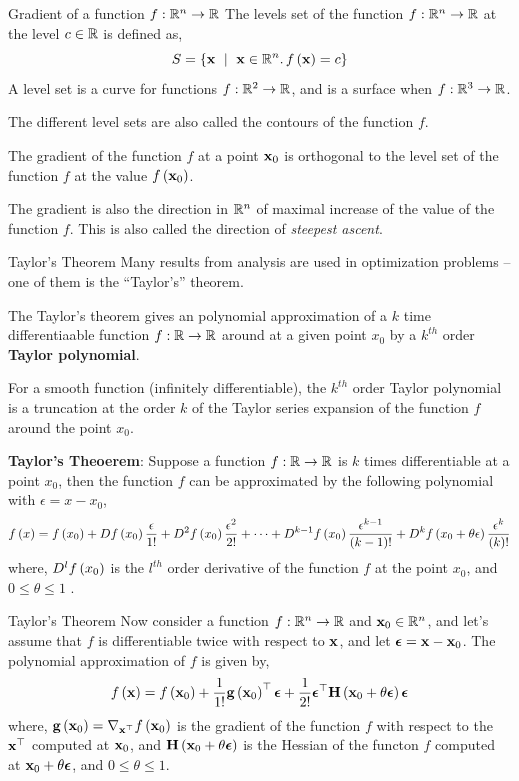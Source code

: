 \documentclass[aspectratio=169]{beamer}
\def\mf{\ensuremath\mathbf}
\def\mb{\ensuremath\mathbb}
\def\lp{\ensuremath\left(}
\def\rp{\ensuremath\right)}
\def\lc{\ensuremath\left\{}
\def\rc{\ensuremath\right\}}
\def\R{\ensuremath\mb{R}}
\newcommand{\ct}[1]{\lp #1\rp}
\begin{document}
\begin{frame}{Gradient of a function $f: \R^n \to \R$}
  The levels set of the function $f: \R^n \to \R$ at the level $c \in \R$ is defined as,
  \[ S = \lc \mf{x} \,\, \mid \,\, \mf{x} \in \R^n. \, f\ct{\mf{x}} = c\rc \] 
  A level set is a curve for functions $f: \R^2 \to \R$, and is a surface when $f: \R^3 \to \R$.
  \vspace{0.25cm}

  The different level sets are also called the contours of the function $f$.
  \vspace{0.25cm}

  The gradient of the function $f$ at a point $\mf{x}_0$ is orthogonal to the level set of the function $f$ at the value $f\ct{\mf{x}_0}$.
  \vspace{0.25cm}

  The gradient is also the direction in $\R^n$ of maximal increase of the value of the function $f$. This is also called the direction of \textit{steepest ascent}.
\end{frame}


\begin{frame}{Taylor's Theorem}
  Many results from analysis are used in optimization problems --  one of them is the ``Taylor's'' theorem.

  The Taylor's theorem gives an polynomial approximation of a $k$ time differentiaable function $f: \R \to \R$ around at a given point $x_0$ by a $k^{th}$ order \textbf{Taylor polynomial}.

  For a smooth function (infinitely differentiable), the $k^{th}$ order Taylor polynomial is a truncation at the order $k$ of the Taylor series expansion of the function $f$ around the point $x_0$.

  \textbf{Taylor's Theoerem}: Suppose a function $f: \R \to \R$ is $k$ times differentiable at a point $x_0$, then the function $f$ can be approximated by the following polynomial with $\epsilon = x - x_0$,
  \[ f\ct{x} = f\ct{x_0} + Df\ct{x_0} \frac{\epsilon}{1!} + D^2f\ct{x_0} \frac{\epsilon^2}{2!} + \cdots + D^{k-1}f\ct{x_0}\frac{\epsilon^{k-1}}{\ct{k-1}!} + D^{k}f\ct{x_0 + \theta \epsilon}\frac{\epsilon^{k}}{\ct{k}!} \]
  where, $D^l f\ct{x_0}$ is the $l^{th}$ order derivative of the function $f$ at the point $x_0$, and $0 \leq \theta \leq 1$ .
\end{frame}


\begin{frame}{Taylor's Theorem}
  Now consider a function $f: \R^n \to \R$ and $\mf{x}_0 \in \R^n$, and let's assume that $f$ is differentiable twice with respect to $\mf{x}$, and let $\bm{\epsilon} = \mf{x} - \mf{x}_0$. The polynomial approximation of $f$ is given by,
  \[ f\ct{\mf{x}} = f\ct{\mf{x}_0} + \frac{1}{1!}\mf{g}\ct{\mf{x}_0}^\top \bm{\epsilon} +  \frac{1}{2!} \bm{\epsilon}^\top \mf{H}\ct{\mf{x}_0 + \theta \bm{\epsilon}} \bm{\epsilon} \]
  where, $\mf{g}\ct{\mf{x}_0} = \nabla_{\mf{x}^\top}f\ct{\mf{x}_0}$ is the gradient of the function $f$ with respect to the $\mf{x}^\top$ computed at $\mf{x}_0$, and $\mf{H}\ct{\mf{x}_0 + \theta \bm{\epsilon}}$ is the Hessian of the functon $f$ computed at $\mf{x}_0 + \theta \bm{\epsilon}$, and $0 \leq \theta \leq 1$.
\end{frame}
\end{document}
